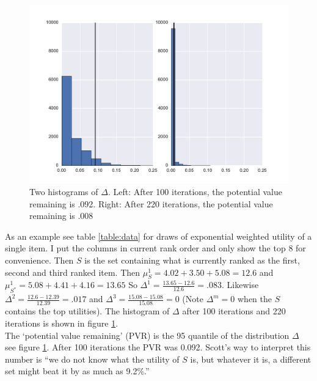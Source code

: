 \documentclass[a4paper,12pt]{article}
\newcommand{\alexander}[1]{\textcolor{blue}{\textbf{(alexander)} #1}}
\begin{document}
\begin{figure}
\includegraphics[width=1\linewidth]{plots/valremhist.pdf}
\caption{Two histograms of $\Delta$. Left: After 100 iterations, the potential value remaining is .092. Right: After 220 iterations, the potential value remaining is .008}
\label{fig:data}
\end{figure}
As an example see table \ref{table:data} for draws of exponential weighted utility of a single item. I put the columns in current rank order and only show the top 8 for convenience. Then $S$ is the set containing what is currently ranked as the first, second and third ranked item. Then $\mu^1_{S}=4.02+3.50+5.08=12.6$ and $\mu_{S^*}^{1}=5.08+4.41+4.16=13.65$ So $\Delta^{1}=\frac{13.65-12.6}{12.6}=.083$. Likewise $\Delta^{2}=\frac{12.6-12.39}{12.39}=.017$ and $\Delta^{3}=\frac{15.08-15.08}{15.08}=0$ (Note $\Delta^m=0$ when the $S$ contains the top utilities). The histogram of $\Delta$ after 100 iterations and 220 iterations is shown in figure \ref{fig:data}. \\
The `potential value remaining' (PVR) is the 95 quantile of the distribution $\Delta$ see figure \ref{fig:data}. After 100 iterations the PVR was 0.092. Scott's way to interpret this number is ``we do not know what the utility of $S$ is, but whatever it is, a different set might beat it by as much as 9.2\%.''\\

\end{document}
